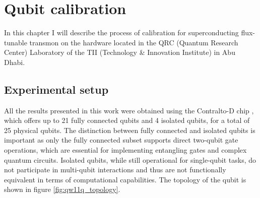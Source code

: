 \chapter{Qubit calibration}

In this chapter I will describe the process of calibration for superconducting flux-tunable transmon on the hardware located in the QRC (Quantum Research Center) Laboratory of the TII (Technology \& Innovation Institute) in Abu Dhabi.

\section{Experimental setup}
All the results presented in this work were obtained using the Contralto-D chip \cite{qw11q}, which offers up to 21 fully connected qubits and 4 isolated qubits, for a total of 25 physical qubits.
The distinction between fully connected and isolated qubits is important as only the fully connected subset supports direct two-qubit gate operations, which are essential for implementing entangling gates and complex quantum circuits. 
Isolated qubits, while still operational for single-qubit tasks, do not participate in multi-qubit interactions and thus are not functionally equivalent in terms of computational capabilities.
The topology of the qubit is shown in figure \ref{fig:qw11q_topology}.

